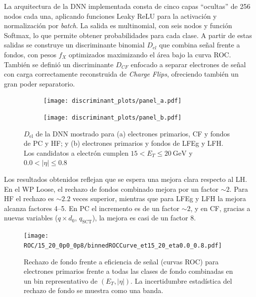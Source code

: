 La arquitectura de la DNN implementada consta de cinco capas ``ocultas'' de 256 nodos cada una, aplicando funciones Leaky ReLU para la activación y normalización por \textit{batch}. La salida es multinomial, con seis nodos y función Softmax, lo que permite obtener probabilidades para cada clase. 
A partir de estas salidas se construye un discriminante binomial $D_{el}$ que combina señal frente a fondos, con pesos $f_X$ optimizados maximizando el área bajo la curva ROC. También se definió un discriminante $D_{CF}$ enfocado a separar electrones de señal con carga correctamente reconstruida de \textit{Charge Flips}, ofreciendo también un gran poder separatorio.  

\begin{figure}[htbp]
  \centering
  \begin{subfigure}[t]{0.48\linewidth}
    \centering
    \texttt{[image: discriminant\_plots/panel\_a.pdf]}
    \caption{}
    \label{fig:dnnDisc_a}
  \end{subfigure}\hfill
  \begin{subfigure}[t]{0.48\linewidth}
    \centering
    \texttt{[image: discriminant\_plots/panel\_b.pdf]}
    \caption{}
    \label{fig:dnnDisc_b}
  \end{subfigure}

  \caption{$D_{\mathrm{el}}$ de la DNN mostrado para (a) electrones primarios, CF y fondos de PC y HF; y (b) electrones primarios y fondos de LFEg y LFH. Los candidatos a electrón cumplen $15<E_{T}\leq 20~\mathrm{GeV}$ y $0.0<|\eta|\leq 0.8$}
  \label{res:dnn_final_disc_ab}
\end{figure}

Los resultados obtenidos reflejan que se espera una mejora clara respecto al LH. En el WP Loose, el rechazo de fondos combinado mejora por un factor $\sim2$. Para HF el rechazo es $\sim2.2$ veces superior, mientras que para LFEg y LFH la mejora alcanza factores 4–5. En PC el incremento es de un factor $\sim2$, y en CF, gracias a nuevas variables ($q\times d_0$, $q_{\text{SCT}}$), la mejora es casi de un factor 8.  

\begin{figure}[h]
  \centering
  \texttt{[image: ROC/15\_20\_0p0\_0p8/binnedROCCurve\_et15\_20\_eta0.0\_0.8.pdf]}
  \caption{Rechazo de fondo frente a eficiencia de señal (curvas ROC) para electrones primarios frente a todas las clases de fondo combinadas en un bin representativo de $(E_{T}, |\eta|)$. La incertidumbre estadística del rechazo de fondo se muestra como una banda.}
  \label{fig:roc_allblkg}
\end{figure}


